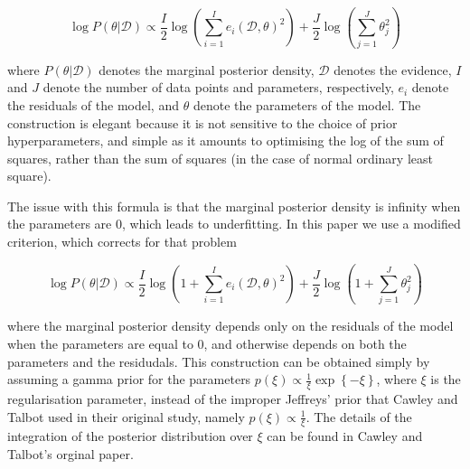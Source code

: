 \documentclass[11pt, oneside]{article}
\begin{document}
\begin{equation}
	\log P(\theta | \mathcal{D}) \propto \frac{I}{2} \log \left(\sum_{i=1}^{I} e_i(\mathcal{D},\theta)^2\right) + \frac{J}{2} \log \left(\sum_{j=1}^{J} \theta_{j}^2 \right)
\end{equation}

where $P(\theta|\mathcal{D})$ denotes the marginal posterior density, $\mathcal{D}$ denotes the evidence, $I$ and $J$ denote the number of data points and parameters, respectively, $e_i$ denote the residuals of the model, and $\theta$ denote the parameters of the model.
The construction is elegant because it is not sensitive to the choice of prior hyperparameters, and simple as it amounts to optimising the log of the sum of squares, rather than the sum of squares (in the case of normal ordinary least square).

The issue with this formula is that the marginal posterior density is infinity when the parameters are 0, which leads to underfitting.
In this paper we use a modified criterion, which corrects for that problem 

\begin{equation}
	\log P(\theta | \mathcal{D}) \propto \frac{I}{2} \log \left(1 + \sum_{i=1}^{I} e_i(\mathcal{D},\theta)^2\right) + \frac{J}{2} \log \left(1 + \sum_{j=1}^{J} \theta_{j}^2 \right)
\end{equation}

where the marginal posterior density depends only on the residuals of the model when the parameters are equal to 0, and otherwise depends on both the parameters and the residudals. 
This construction can be obtained simply by assuming a gamma prior for the parameters $p(\xi) \propto \frac{1}{\xi} \exp\left\{- \xi \right\}$, where $\xi$ is the regularisation parameter, instead of the improper Jeffreys' prior that Cawley and Talbot used in their original study, namely $p(\xi) \propto \frac{1}{\xi}$. 
The details of the integration of the posterior distribution over $\xi$ can be found in Cawley and Talbot's orginal paper.
\end{document}
